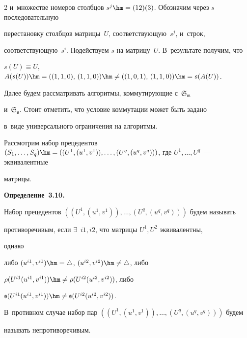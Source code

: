 \begin{multicols}{2}
и~множестве номеров столбцов $s^j \hm= (12)(3)$. Обозначим через $s$ последовательную 


перестановку столбцов матрицы~$U$, соответствующую~$s^j$, и~строк, 


соответствующую~$s^i$. Подействуем $s$ на матрицу~$U$. В~результате получим, что 


$s(U)\equiv U$, $A(s(U))\hm=  ((1,1,0),\, (1,1,0))\hm\ne ((1,0,1),\, 


(1,1,0)) \hm= s(A(U))$.





Далее будем рассматривать алгоритмы, коммутирующие с~$\mathfrak{S_m}$ 


и~$\mathfrak{S_n}$. Стоит отметить, что условие коммутации может быть задано 


в~виде универсального ограничения на алгоритмы.





Рассмотрим набор прецедентов $(S_1,\ldots,S_q) \hm= ((U^1, (u^1,v^1)),\ldots,


(U^q, (u^q,v^q)))$, где $U^1, \ldots, U^q$~--- эквивалентные 


матрицы.





\smallskip





\noindent


\textbf{Определение~3.10.}\


Набор прецедентов $((U^1, (u^1,v^1)),\ldots,(U^q, (u^q,v^q)))$ будем называть 


противоречивым, если $\exists$\ $i1, i2$, что матрицы $U^1, U^2$ эквивалентны, 


однако


либо $(u^{i1},v^{i1})\hm=\triangle$, $(u^{i2},v^{i2})\hm\ne\triangle$,  либо 


$\rho(U^{i1}(u^{i1},v^{i1}))\hm\ne \rho(U^{i2}(u^{i2},v^{i2}))$, либо 


$\mathfrak{s}(U^{i1}(u^{i1},v^{i1})) \hm\ne \mathfrak{s}(U^{i2}(u^{i2},v^{i2}))$. 


В~противном случае набор пар $((U^1, (u^1,v^1)),\ldots,(U^q, (u^q,v^q)))$ будем 


называть непротиворечивым.









\end{multicols}
